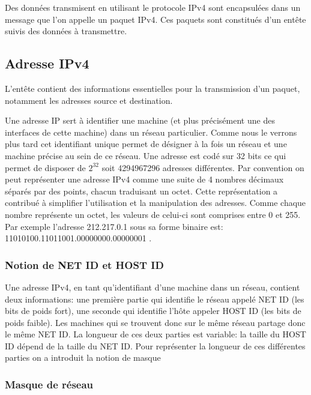 Des données transmisent en utilisant le protocole IPv4 sont encapsulées dans un message que
l'on appelle un paquet IPv4. Ces paquets sont constitués d'un entête suivis des données à transmettre.

\subsection{Adresse IPv4}
\label{sec:addripv4}

L'entête contient des informations essentielles pour la transmission d'un paquet, notamment les
adresses source et destination.

Une adresse IP sert à identifier une machine (et plus précisément une des interfaces de cette machine)
dans un réseau particulier.
Comme nous le verrons plus tard cet identifiant unique permet de désigner à la fois un
réseau et une machine précise au sein de ce réseau.
Une adresse est codé sur 32 bits ce qui permet de disposer de $2^{32}$ soit 4294967296 adresses différentes.
Par convention on peut représenter une adresse IPv4 comme une suite de 4 nombres décimaux séparés par des points,
chacun traduisant un octet. Cette représentation a contribué à simplifier l'utilisation et la manipulation
des adresses.
Comme chaque nombre représente un octet, les valeurs de celui-ci sont comprises entre 0 et 255.
Par exemple l'adresse 212.217.0.1 sous sa forme binaire est:
 11010100.11011001.00000000.00000001 .

\subsubsection{Notion de NET ID et HOST ID}
Une adresse IPv4, en tant qu'identifiant d'une machine dans un réseau, contient
deux informations: une première partie qui identifie le réseau appelé NET ID
(les bits de poids fort), une seconde qui identifie l’hôte appeler HOST ID (les
bits de poids faible).  Les machines qui se trouvent donc sur le même réseau
partage donc le même NET ID.  
\smallbreak
La longueur de ces deux parties est
variable: la taille du HOST ID dépend de la taille du NET ID. Pour représenter
la longueur de ces différentes parties on a introduit la notion de masque

\subsubsection{Masque de réseau}

